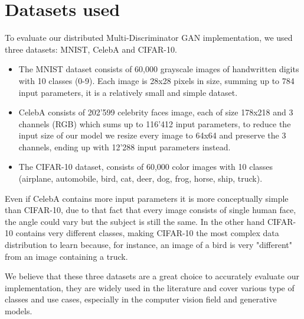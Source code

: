 \section{Datasets used}
To evaluate our distributed Multi-Discriminator GAN implementation, we used three datasets: MNIST, CelebA and CIFAR-10.

\begin{itemize}
    \item The MNIST dataset consists of 60,000 grayscale images of handwritten digits with 10 classes (0-9). Each image is 28x28 pixels in size, summing up to 784 input parameters, it is a relatively small and simple dataset.
    \item CelebA consists of 202'599 celebrity faces image, each of size 178x218 and 3 channels (RGB) which sums up to 116'412 input parameters, to reduce the input size of our model we resize every image to 64x64 and preserve the 3 channels, ending up with 12'288 input parameters instead.
    \item The CIFAR-10 dataset, consists of 60,000 color images with 10 classes (airplane, automobile, bird, cat, deer, dog, frog, horse, ship, truck).
\end{itemize}

Even if CelebA contains more input parameters it is more conceptually simple than CIFAR-10, due to that fact that every image consists of single human face, the angle could vary but the subject is still the same. In the other hand CIFAR-10 contains very different classes, making CIFAR-10 the most complex data distribution to learn because, for instance, an image of a bird is very "different" from an image containing a truck.

We believe that these three datasets are a great choice to accurately evaluate our implementation, they are widely used in the literature and cover various type of classes and use cases, especially in the computer vision field and generative models.

